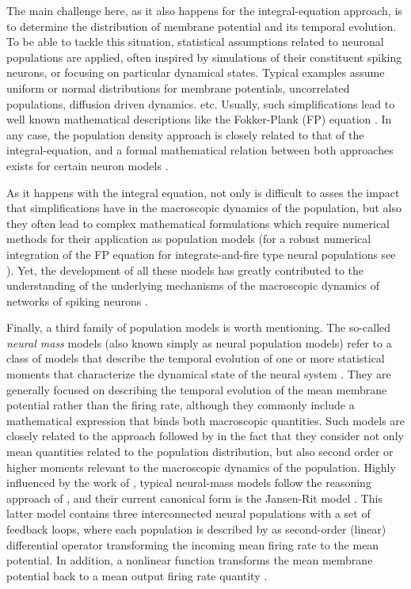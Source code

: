 The main challenge
here, as it also happens for the integral-equation approach, is to
determine the distribution of membrane potential and its temporal
evolution. To be able to tackle this situation, statistical
assumptions related to neuronal populations are applied, often
inspired by simulations of their constituent spiking neurons, or
focusing on particular dynamical states. Typical examples assume
uniform or normal distributions for membrane potentials,
uncorrelated populations, diffusion driven dynamics. etc. Usually,
such simplifications lead to well known mathematical 
descriptions like the Fokker-Plank (FP) equation \citep{Risken1989,Abbott1993,Brunel1999,Brunel2000,Knight2000,Nykamp2000,Brunel2001,Fourcaud2002}. 
In any case, the population
density approach is closely related to that of the integral-equation,
and a formal mathematical relation between both approaches exists for
certain neuron models \citep{Gerstner2014}.

As it happens with the
integral equation, not only is difficult to asses the impact that
simplifications have in the macroscopic dynamics of the
population, but also they often lead to complex mathematical formulations
which require numerical methods for their application as population
models (for a robust numerical integration of the FP equation for
integrate-and-fire type neural populations see
\citet{Richardson2007,Richardson2009}). Yet, the development of all
these models has greatly 
contributed to the understanding of the underlying mechanisms of the
macroscopic dynamics of networks of spiking neurons
\citep{Fusi1999,Omurtag2000}.

Finally, a third family of population models is worth mentioning. The
so-called \textit{neural mass} models (also known simply as neural
population models) refer to a class of models that describe the
temporal evolution of one or more statistical moments that
characterize the dynamical state of the neural system
\citep{Liley2013}. They are generally focused on describing the
temporal evolution of the mean membrane potential rather than the
firing rate, although they commonly include a mathematical expression
that binds both macroscopic quantities. Such models are closely
related to the approach followed by \citet{Amari1972} in the fact that
they consider not only mean quantities related to the population
distribution, but also second order or higher moments relevant to the
macroscopic dynamics of the population. Highly
influenced by the work of \citet{LopesdaSilva1974}, typical neural-mass models
follow the reasoning approach of \citet{Freeman1975}, and their
current canonical form is the Jansen-Rit model
\citep{Jansen1993,Jansen1995}. This latter model contains three
interconnected neural populations with a set of feedback loops, where
each population is described by as second-order (linear) differential
operator transforming the incoming mean firing rate to the mean
potential. In addition, a nonlinear function transforms the mean
membrane potential back to a mean output firing rate quantity \citep{Knosche2014}.


